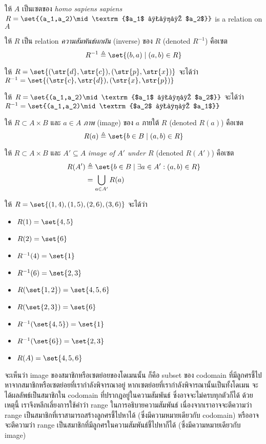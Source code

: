 \begin{example}
ให้ $A$ เป็นเซตของ \textit{homo sapiens sapiens} \enskip $R=\set{(a_1,a_2)\mid\textrm{$a_1$ ชอบ $a_2$}}$ is a relation on $A$
\end{example}

\begin{definition}
ให้ $R$ เป็น relation \enskip \emph{ความสัมพันธ์ผกผัน} (inverse) ของ $R$ (denoted $R^{-1}$) คือเซต \[R^{-1}\triangleq\set{(b,a)\mid(a,b)\in R}\]
\end{definition}
%
\begin{example}
ให้ $R=\set{(\str{d},\str{c}),(\str{p},\str{x})}$ จะได้ว่า $R^{-1}=\set{(\str{c},\str{d}),(\str{x},\str{p})}$
\end{example}

\begin{example}
ให้ $R=\set{(a_1,a_2)\mid\textrm{$a_1$ ชอบ $a_2$}}$ จะได้ว่า $R^{-1}=\set{(a_1,a_2)\mid\textrm{$a_2$ ชอบ $a_1$}}$
\end{example}

\begin{definition}
ให้ $R\subset A\times B$ และ $a\in A$ \enskip \emph{ภาพ} (image) ของ $a$ ภายใต้ $R$ (denoted $R(a)$) คือเซต \[R(a)\triangleq\set{b\in B\mid (a,b)\in R}\]
\end{definition}
\begin{definition}
ให้ $R\subset A\times B$ และ $A'\subseteq A$ \enskip \emph{image of $A'$ under $R$} (denoted $R(A')$) คือเซต
\begin{align*}
R(A')&\triangleq\set{b\in B\mid\exists a\in A': (a,b)\in R} \\
&=\bigcup_{a\in A'}{R(a)}
\end{align*}
\end{definition}
%
\begin{example}
ให้ $R=\set{(1,4),(1,5),(2,6),(3,6)}$ จะได้ว่า
\begin{itemize}
\item $R(1)=\set{4,5}$
\item $R(2)=\set{6}$
\item $R^{-1}(4)=\set{1}$
\item $R^{-1}(6)=\set{2,3}$
\item $R(\set{1,2})=\set{4,5,6}$
\item $R(\set{2,3})=\set{6}$
\item $R^{-1}(\set{4,5})=\set{1}$
\item $R^{-1}(\set{6})=\set{2,3}$
\item $R(A)=\set{4,5,6}$
\end{itemize}
\end{example}
จะเห็นว่า image ของสมาชิกหรือเซตย่อยของโดเมนนั้น ก็คือ subset ของ codomain ที่มีลูกศรชี้ไปหาจากสมาชิกหรือเซตย่อยที่เรากำลังพิจารณาอยู่ \enskip หากเซตย่อยที่เรากำลังพิจารณานั้นเป็นทั้งโดเมน จะได้ผลลัพธ์เป็นสมาชิกใน codomain ที่ปรากฎอยู่ในความสัมพันธ์ ซึ่งอาจจะไม่ครบทุกตัวก็ได้ \enskip ด้วยเหตุนี้ เราจึงหลีกเลี่ยงการใช้คำว่า range ในการอธิบายความสัมพันธ์ เนื่องจากเราอาจจะตีความว่า range เป็นสมาชิกที่เราสามารถสร้างลูกศรชี้ไปหาได้ (ซึ่งมีความหมายเดียวกับ codomain) หรืออาจจะตีความว่า range เป็นสมาชิกที่มีลูกศรในความสัมพันธ์ชี้ไปหาก็ได้ (ซึ่งมีความหมายเดียวกับ image)

